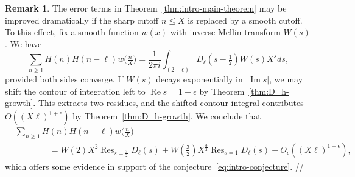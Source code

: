 \documentclass[11pt,reqno]{amsart}
\theoremstyle{plain}
\theoremstyle{definition}
\newtheorem{remark}[theorem]{Remark}
\numberwithin{equation}{section}
\renewcommand{\Im}{\operatorname{Im}}
\renewcommand{\Re}{\operatorname{Re}}
\DeclareMathOperator*{\Res}{Res}
\begin{document}
\begin{remark} \label{rem:smooth-result}
The error terms in Theorem~\ref{thm:intro-main-theorem} may be improved dramatically if the sharp cutoff $n \leq X$ is replaced by a smooth cutoff. To this effect, fix a smooth function $w(x)$ with inverse Mellin transform $W(s)$. We have
\[
	\sum_{n \geq 1} H(n) H(n-\ell) w\big(\tfrac{n}{X}\big)
	 = \frac{1}{2\pi i} \int_{(2+\epsilon)} D_\ell(s-\tfrac{1}{2}) W(s) X^s ds,
\]
provided both sides converge. If $W(s)$ decays exponentially in $\vert \Im s \vert$, we may shift the contour of integration left to $\Re s = 1 + \epsilon$ by Theorem~\ref{thm:D_h-growth}. This extracts two residues, and the shifted contour integral contributes $O((X\ell)^{1+\epsilon})$ by Theorem~\ref{thm:D_h-growth}. We conclude that
\begin{align*}
	& \sum_{n \geq 1} H(n) H(n-\ell) w\big(\tfrac{n}{X}\big) \\[-.5em]
	& \qquad \qquad
	= W(2) X^2 \Res_{s=\frac{3}{2}} D_\ell(s)
		+ W(\tfrac{3}{2}) X^\frac{3}{2} \Res_{s=1} D_\ell(s) + O_\epsilon((X\ell)^{1+\epsilon}),
\end{align*}
which offers some evidence in support of the conjecture~\eqref{eq:intro-conjecture}. \hfill //
\end{remark}

\vspace{5 mm}


\end{document}
